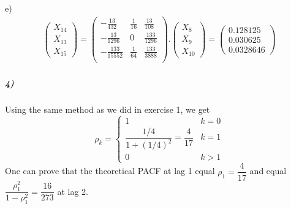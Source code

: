 \documentclass{article}
\begin{document}
e)\begin{align*}
\begin{pmatrix}
X_{14} \\
X_{13} \\
X_{15}
\end{pmatrix}
=
\begin{pmatrix}
 -\frac{13}{432} & \frac{1}{16} & \frac{13}{108} \\
 -\frac{13}{1296} & 0 & \frac{133}{1296} \\
 -\frac{133}{15552} & \frac{1}{64} & \frac{133}{3888} \\
\end{pmatrix}
.
\begin{pmatrix}
X_{8} \\
X_{9} \\
X_{10}
\end{pmatrix}
=
\begin{pmatrix}
0.128125 \\
0.030625 \\
0.0328646
\end{pmatrix}
\end{align*}
\subparagraph{4)}
Using the same method as we did in exercise 1, we get 
$$
\rho_k=
\left\{
\begin{array}{cc}
 1 & k=0 \\
 \dfrac{1/4}{1+(1/4)^2}=\dfrac{4}{17} & k=1\\
 0 & k>1
    \end{array}
\right. 
$$
One can prove that the theoretical PACF at lag 1 equal $\rho_1=\dfrac{4}{17}$ and equal $\dfrac{\rho_1^2}{1-\rho_1^2}=\dfrac{16}{273}$ at lag 2.
\end{document}
